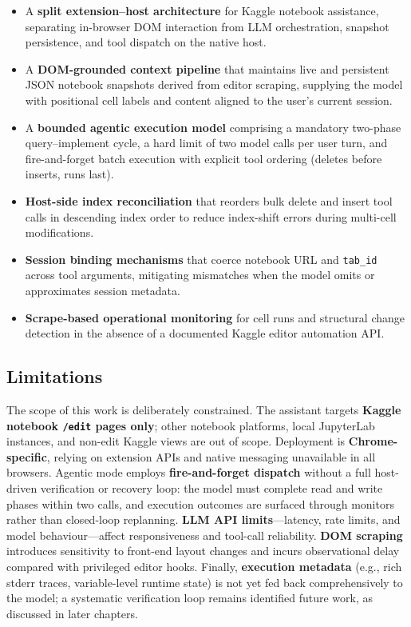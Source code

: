 \begin{itemize}
  \item A \textbf{split extension--host architecture} for Kaggle notebook assistance, separating in-browser DOM interaction from \ac{LLM} orchestration, snapshot persistence, and tool dispatch on the native host.
  \item A \textbf{DOM-grounded context pipeline} that maintains live and persistent JSON notebook snapshots derived from editor scraping, supplying the model with positional cell labels and content aligned to the user's current session.
  \item A \textbf{bounded agentic execution model} comprising a mandatory two-phase query--implement cycle, a hard limit of two model calls per user turn, and fire-and-forget batch execution with explicit tool ordering (deletes before inserts, runs last).
  \item \textbf{Host-side index reconciliation} that reorders bulk delete and insert tool calls in descending index order to reduce index-shift errors during multi-cell modifications.
  \item \textbf{Session binding mechanisms} that coerce notebook URL and \texttt{tab\_id} across tool arguments, mitigating mismatches when the model omits or approximates session metadata.
  \item \textbf{Scrape-based operational monitoring} for cell runs and structural change detection in the absence of a documented Kaggle editor automation \ac{API}.
\end{itemize}

\subsection{Limitations}
\label{sec:limitations}

The scope of this work is deliberately constrained. The assistant targets \textbf{Kaggle notebook \texttt{/edit} pages only}; other notebook platforms, local JupyterLab instances, and non-edit Kaggle views are out of scope. Deployment is \textbf{Chrome-specific}, relying on extension APIs and native messaging unavailable in all browsers. Agentic mode employs \textbf{fire-and-forget dispatch} without a full host-driven verification or recovery loop: the model must complete read and write phases within two calls, and execution outcomes are surfaced through monitors rather than closed-loop replanning. \textbf{\ac{LLM} \ac{API} limits}---latency, rate limits, and model behaviour---affect responsiveness and tool-call reliability. \textbf{DOM scraping} introduces sensitivity to front-end layout changes and incurs observational delay compared with privileged editor hooks. Finally, \textbf{execution metadata} (e.g., rich stderr traces, variable-level runtime state) is not yet fed back comprehensively to the model; a systematic verification loop remains identified future work, as discussed in later chapters.

